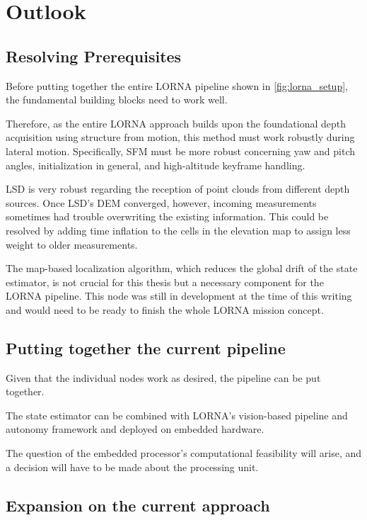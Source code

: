\chapter{Outlook}
\label{sec:outlook}

\section{Resolving Prerequisites}

Before putting together the entire LORNA pipeline shown in \cref{fig:lorna_setup}, the fundamental building blocks need to work well. 

Therefore, as the entire LORNA approach builds upon the foundational depth acquisition using structure from motion, this method must work robustly during lateral motion. Specifically, SFM must be more robust concerning yaw and pitch angles, initialization in general, and high-altitude keyframe handling.

LSD is very robust regarding the reception of point clouds from different depth sources. Once LSD's DEM converged, however, incoming measurements sometimes had trouble overwriting the existing information. This could be resolved by adding time inflation to the cells in the elevation map to assign less weight to older measurements.

The map-based localization algorithm, which reduces the global drift of the state estimator, is not crucial for this thesis but a necessary component for the LORNA pipeline. This node was still in development at the time of this writing and would need to be ready to finish the whole LORNA mission concept.

\section{Putting together the current pipeline}

Given that the individual nodes work as desired, the pipeline can be put together. 

The state estimator can be combined with LORNA's vision-based pipeline and autonomy framework and deployed on embedded hardware.

The question of the embedded processor's computational feasibility will arise, and a decision will have to be made about the processing unit.

\section{Expansion on the current approach}

